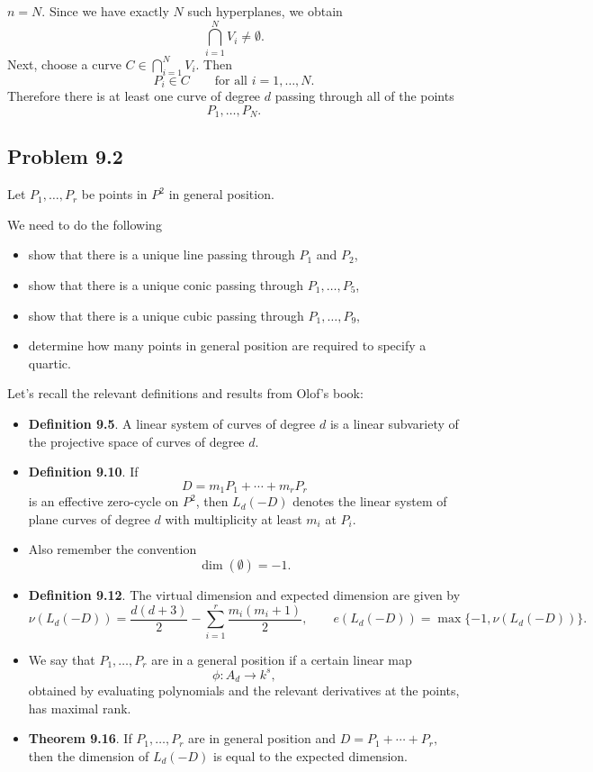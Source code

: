 \documentclass[a4paper,12pt]{article}
\theoremstyle{plain}
\theoremstyle{definition}
\theoremstyle{remark}
\begin{document}
$n=N.$
Since we have exactly $N$ such hyperplanes, we obtain
\[
\bigcap_{i=1}^N V_i\neq \emptyset.
\]
Next, choose a curve
$C\in \bigcap_{i=1}^N V_i.$
Then
\[
P_i\in C
\qquad\text{for all } i=1,\dots,N.
\]
Therefore there is at least one curve of degree $d$ passing through all of the points
\[
P_1,\dots,P_N.
\]



\subsection*{Problem 9.2}

Let $P_1,\dots,P_r$ be points in $P^2$ in general position.

We need to do the following
\begin{itemize}
\item[a)] show that there is a unique line passing through $P_1$ and $P_2$,
\item[b)] show that there is a unique conic passing through $P_1,\dots,P_5$,
\item[c)] show that there is a unique cubic passing through $P_1,\dots,P_9$,
\item[d)] determine how many points in general position are required to specify a quartic.
\end{itemize}

\medskip

Let's recall the relevant definitions and results from Olof's book:
\begin{itemize}
\item \textbf{Definition 9.5}. A linear system of curves of degree $d$ is a linear subvariety of the projective space of curves of degree $d$.

\item \textbf{Definition 9.10}. If
\[
D=m_1P_1+\cdots+m_rP_r
\]
is an effective zero-cycle on $P^2$, then $L_d(-D)$ denotes the linear system of plane curves of degree $d$ with multiplicity at least $m_i$ at $P_i$.

\item Also remember the convention
\[
\dim(\emptyset)=-1.
\]

\item \textbf{Definition 9.12}. The virtual dimension and expected dimension are given by
\[
\nu(L_d(-D))=\frac{d(d+3)}{2}-\sum_{i=1}^r \frac{m_i(m_i+1)}{2},
\qquad
e(L_d(-D))=\max\{-1,\nu(L_d(-D))\}.
\]

\item We say that
$
P_1,\dots,P_r
$
are in a general position if a certain linear map
\[
\phi:A_d\to k^s,
\]
obtained by evaluating polynomials and the relevant derivatives at the points, has maximal rank.

\item \textbf{Theorem 9.16}. If
$
P_1,\dots,P_r
$
are in general position and
$
D=P_1+\cdots+P_r,
$
then the dimension of $L_d(-D)$ is equal to the expected dimension.
\end{itemize}
\end{document}
